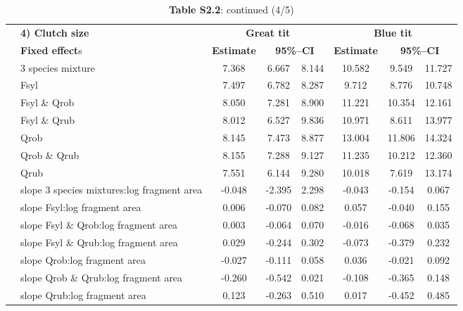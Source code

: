 \documentclass[10pt, twoside]{book} %
\begin{document}
\clearpage
\thispagestyle{plain}
\begin{landscape}
	\begin{table}
		\begin{center}
			\begin{footnotesize}
				\caption*{\textbf{Table S2.2}: continued (4/5)}
				
				\begingroup
				\setlength{\tabcolsep}{10pt} %
				\renewcommand{\arraystretch}{1.5} %
				\begin{tabular}{c l c c c c c c}
					\toprule
					& \textbf{4) Clutch size} & \multicolumn{3}{c}{\textbf{Great tit}} & \multicolumn{3}{c}{\textbf{Blue tit}}\\
					
					& \textbf{Fixed effect}s & \textbf{Estimate} & \multicolumn{2}{c}{\textbf{95\%--CI}} & \textbf{Estimate} & \multicolumn{2}{c}{\textbf{95\%--CI}}\\
					\cline{2-8}
					
					\multirow{7}{*}{\rotatebox[origin=c]{90}{\parbox[c]{3cm}{\centering Intercept (value for  average fragment area)}}}
					
					& 3 species mixture & 7.368 & 6.667 & 8.144 & 	10.582 & 9.549 & 11.727\\
					& Fsyl & 7.497 & 6.782 & 8.287 & 	9.712 & 8.776 & 10.748\\
					& Fsyl \& Qrob & 8.050 & 7.281 & 8.900 & 	11.221 & 10.354 & 12.161\\
					& Fsyl \& Qrub &8.012 & 6.527 & 9.836 & 	10.971 & 8.611 & 13.977\\
					& Qrob & 8.145 & 7.473 & 8.877 & 	13.004 & 11.806 & 14.324\\
					& Qrob \& Qrub & 8.155 & 7.288 & 9.127 & 	11.235 & 10.212 & 12.360\\
					& Qrub & 7.551 & 6.144 & 9.280 & 	10.018 & 7.619 & 13.174\\
					\cline{2-8}
					\multirow{7}{*}{\rotatebox[origin=c]{90}{\parbox[c]{3cm}{\centering Slopes)}}} & slope 3 species mixtures:log fragment area & -0.048 & -2.395 & 2.298 & 	-0.043 & -0.154 & 0.067\\
					& slope Fsyl:log fragment area & 0.006 & -0.070 & 0.082 & 	0.057 & -0.040 & 0.155\\
					& slope Fsyl \& Qrob:log fragment area & 0.003 & -0.064 & 0.070 & 	-0.016 & -0.068 & 0.035\\
					& slope Fsyl \& Qrub:log fragment area & 0.029 & -0.244 & 0.302 & 	-0.073 & -0.379 & 0.232\\
					& slope Qrob:log fragment area & -0.027 & -0.111 & 0.058 & 	0.036 & -0.021 & 0.092\\
					& slope Qrob \& Qrub:log fragment area & -0.260 & -0.542 & 0.021 & 	-0.108 & -0.365 & 0.148\\
					& slope Qrub:log fragment area & 0.123 & -0.263 & 0.510 & 	0.017 & -0.452 & 0.485\\
					\cline{2-8}
					

\end{tabular}
\end{footnotesize}
\end{center}
\end{table}
\end{landscape}
\end{document}
